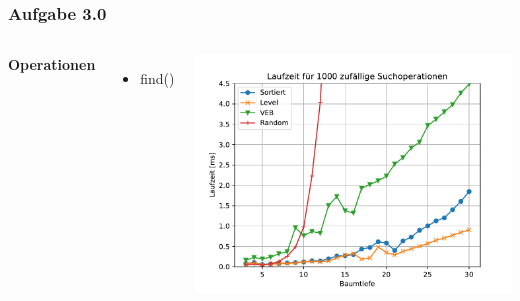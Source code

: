 \documentclass[aspectratio=169]{beamer}
\begin{document}
\begin{frame}
\frametitle{Aufgabe 3.0}
\begin{columns}[c] %
	
	\textbf{Operationen}
	\begin{itemize}
		\item find()
	\end{itemize}
	
	\includegraphics[scale=.6]{Figure_2.pdf}
	

\end{columns}
\end{frame}

\end{document}
